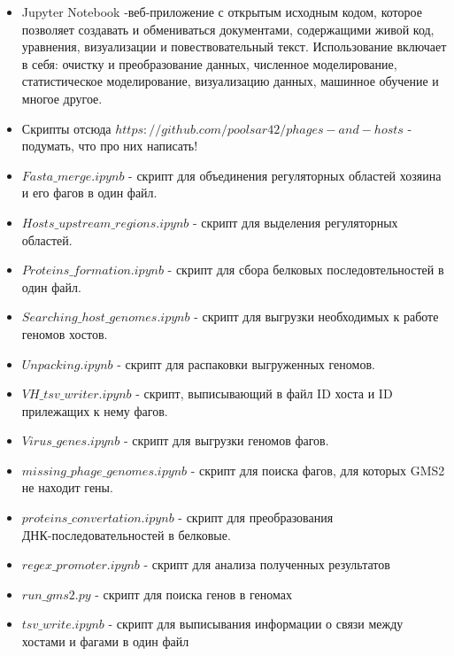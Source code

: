 \documentclass[a4paper,12pt]{article}
\begin{document}
\begin{itemize}
    \item Jupyter Notebook -веб-приложение с открытым исходным кодом, которое позволяет создавать и обмениваться
    документами, содержащими живой код, уравнения, визуализации и повествовательный текст. Использование включает в себя:
    очистку и преобразование данных, численное моделирование, статистическое моделирование, визуализацию данных, машинное
    обучение и многое другое. \cite{jupyter}
    
    \item Скрипты отсюда \(https://github.com/poolsar42/phages-and-hosts\) - подумать, что про них написать!
    \cite{github}
    
    \item \(Fasta\_merge.ipynb\) - скрипт для объединения регуляторных областей хозяина и его фагов в один файл.
    \item \(Hosts\_upstream\_regions.ipynb\) - скрипт для выделения регуляторных областей.
    \item \(Proteins\_formation.ipynb\) - скрипт для сбора белковых последовтельностей в один файл.
    \item \(Searching\_host\_genomes.ipynb\) - скрипт для выгрузки необходимых к работе геномов хостов.
    \item \(Unpacking.ipynb\) - скрипт для распаковки выгруженных геномов.
    \item \(VH\_tsv\_writer.ipynb\) - скрипт, выписывающий в файл ID хоста и ID прилежащих к нему фагов.
    \item \(Virus\_genes.ipynb\) - скрипт для выгрузки геномов фагов.
    \item \(missing\_phage\_genomes.ipynb\) - скрипт для поиска фагов, для которых GMS2 не находит гены.
    \item \(proteins\_convertation.ipynb \) - скрипт для преобразования \\ ДНК-последовательностей
                                в белковые.
    \item \(regex\_promoter.ipynb \) - скрипт для анализа полученных результатов
    \item \(run\_gms2.py\) - скрипт для поиска генов в геномах
    \item \(tsv\_write.ipynb\) - скрипт для выписывания информации о связи между хостами и фагами в один файл
\end{itemize}
\end{document}
